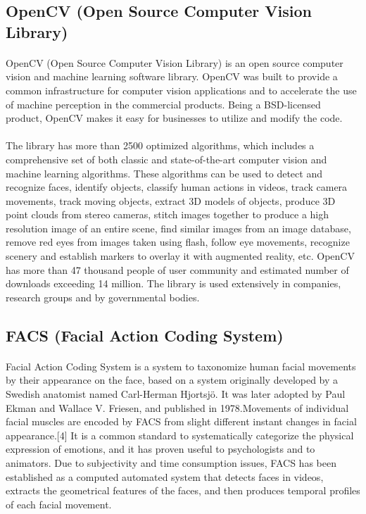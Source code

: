 \documentclass[a4paper,12pt,oneside]{article}
\begin{document}
\subsection{OpenCV (Open Source Computer Vision Library)}
\paragraph{}
OpenCV (Open Source Computer Vision Library) is an open source computer vision and machine learning software library. OpenCV was built to provide a common infrastructure for computer vision applications and to accelerate the use of machine perception in the commercial products. Being a BSD-licensed product, OpenCV makes it easy for businesses to utilize and modify the code.

\paragraph{}
The library has more than 2500 optimized algorithms, which includes a comprehensive set of both classic and state-of-the-art computer vision and machine learning algorithms. These algorithms can be used to detect and recognize faces, identify objects, classify human actions in videos, track camera movements, track moving objects, extract 3D models of objects, produce 3D point clouds from stereo cameras, stitch images together to produce a high resolution image of an entire scene, find similar images from an image database, remove red eyes from images taken using flash, follow eye movements, recognize scenery and establish markers to overlay it with augmented reality, etc. OpenCV has more than 47 thousand people of user community and estimated number of downloads exceeding 14 million. The library is used extensively in companies, research groups and by governmental bodies.

\subsection{FACS (Facial Action Coding System)}
\paragraph{}
Facial Action Coding System is a system to taxonomize human facial movements by their appearance on the face, based on a system originally developed by a Swedish anatomist named Carl-Herman Hjortsjö. It was later adopted by Paul Ekman and Wallace V. Friesen, and published in 1978.Movements of individual facial muscles are encoded by FACS from slight different instant changes in facial appearance.[4] It is a common standard to systematically categorize the physical expression of emotions, and it has proven useful to psychologists and to animators. Due to subjectivity and time consumption issues, FACS has been established as a computed automated system that detects faces in videos, extracts the geometrical features of the faces, and then produces temporal profiles of each facial movement.
\end{document}
